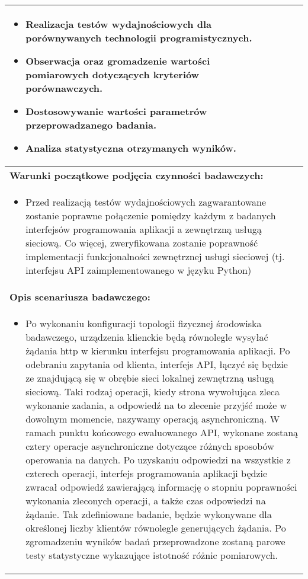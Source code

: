 \begin{longtable}[c]{|llll|}
{\begin{itemize}
            \item Realizacja testów wydajnościowych dla porównywanych technologii programistycznych.
            \item Obserwacja oraz gromadzenie wartości pomiarowych dotyczących kryteriów porównawczych.
            \item Dostosowywanie wartości parametrów przeprowadzanego badania.
            \item Analiza statystyczna otrzymanych wyników.
        \end{itemize}
    }                                                           \\ \hline
    \multicolumn{4}{|l|}{\textbf{Warunki początkowe podjęcia czynności badawczych:}} \\ \hline
    \multicolumn{4}{|p{\linewidth}|}{
        \begin{itemize}[label={}]
            \item Przed realizacją testów wydajnościowych zagwarantowane zostanie poprawne połączenie pomiędzy każdym z badanych interfejsów programowania aplikacji a zewnętrzną usługą sieciową. Co więcej, zweryfikowana zostanie poprawność implementacji funkcjonalności zewnętrznej usługi sieciowej (tj. interfejsu API zaimplementowanego w języku Python) 
          \end{itemize}
    }                                                           \\ \hline
    \multicolumn{4}{|l|}{\textbf{Opis scenariusza badawczego:}}                      \\ \hline
    \multicolumn{4}{|p{\linewidth}|}{
        \begin{itemize}[label={}]
            \item Po wykonaniu konfiguracji topologii fizycznej środowiska badawczego, urządzenia klienckie będą równolegle wysyłać żądania http w kierunku interfejsu programowania aplikacji. Po odebraniu zapytania od klienta, interfejs API, łączyć się będzie ze znajdującą się w obrębie sieci lokalnej zewnętrzną usługą sieciową. Taki rodzaj operacji, kiedy strona wywołująca zleca wykonanie zadania, a odpowiedź na to zlecenie przyjść może w dowolnym momencie, nazywamy operacją asynchroniczną. W ramach punktu końcowego ewaluowanego API, wykonane zostaną cztery operacje asynchroniczne dotyczące różnych sposobów operowania na danych. Po uzyskaniu odpowiedzi na wszystkie z czterech operacji, interfejs programowania aplikacji będzie zwracał odpowiedź zawierającą informację o stopniu poprawności wykonania zleconych operacji, a także czas odpowiedzi na żądanie. Tak zdefiniowane badanie, będzie wykonywane dla określonej liczby klientów równolegle generujących żądania. Po zgromadzeniu wyników badań przeprowadzone zostaną parowe testy statystyczne wykazujące istotność różnic pomiarowych.

\end{itemize}}
\end{longtable}
